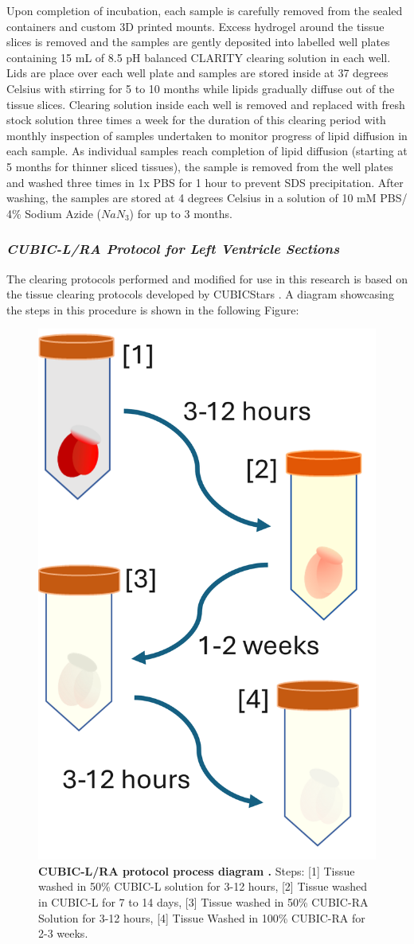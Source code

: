 Upon completion of incubation, each sample is carefully removed from the sealed containers and custom 3D printed mounts. Excess hydrogel around the tissue slices is removed and the samples are gently deposited into labelled well plates containing 15 mL of 8.5 pH balanced CLARITY clearing solution in each well. Lids are place over each well plate and samples are stored inside at 37 degrees Celsius with stirring for 5 to 10 months while lipids gradually diffuse out of the tissue slices. Clearing solution inside each well is removed and replaced with fresh stock solution three times a week for the duration of this clearing period with monthly inspection of samples undertaken to monitor progress of lipid diffusion in each sample. As individual samples reach completion of lipid diffusion (starting at 5 months for thinner sliced tissues), the sample is removed from the well plates and washed three times in 1x PBS for 1 hour to prevent SDS precipitation. After washing, the samples are stored at 4 degrees Celsius in a solution of 10 mM PBS/ 4\% Sodium Azide ($NaN_3$) for up to 3 months. 


\subsubsection{\textit{CUBIC-L/RA Protocol for Left Ventricle Sections}}

The clearing protocols performed and modified for use in this research is based on the tissue clearing protocols developed by CUBICStars \cite{tainaka_chemical_2018}. A diagram showcasing the steps in this procedure is shown in the following Figure:

\begin{figure}[H]
    \centering
    \includegraphics[width=0.5\linewidth]{Figures/Figure3.2.png}
    \caption{\textbf{CUBIC-L/RA protocol process diagram \cite{ueda_cubic_nodate}.} Steps: [1] Tissue washed in 50\% CUBIC-L solution for 3-12 hours, [2] Tissue washed in CUBIC-L for 7 to 14 days, [3] Tissue washed in 50\% CUBIC-RA Solution for 3-12 hours, [4] Tissue Washed in 100\% CUBIC-RA for 2-3 weeks.}
    \label{fig:enter-label}
\end{figure}


